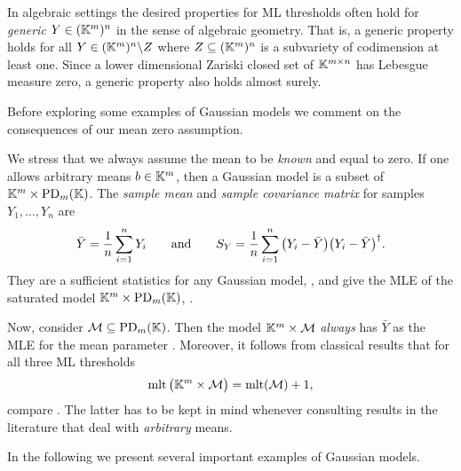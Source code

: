 \begin{remark}\label{rem:GenericVsAlmostSurely}
	In algebraic settings the desired properties for ML thresholds often hold for \emph{generic} $Y \in (\mathbb K^m)^n$ in the sense of algebraic geometry. That is, a generic property holds for all $Y \in (\mathbb K^m)^n \backslash Z$ where $Z \subseteq (\mathbb K^m)^n$ is a subvariety of codimension at least one.
	Since a lower dimensional Zariski closed set of $\mathbb K^{m \times n}$ has Lebesgue measure zero, a generic property also holds almost surely.
	\hfill\remSymbol
\end{remark}

Before exploring some examples of Gaussian models we comment on the consequences of our mean zero assumption.

\begin{remark}\label{rem:MeanZeroVsGeneralMean}
	We stress that we always assume the mean to be \emph{known} and equal to zero.
	If one allows arbitrary means $b \in \mathbb K^m$, then a Gaussian model is a subset of $\mathbb K^m \times \operatorname{PD}_m(\mathbb K)$. The \emph{sample mean} and \emph{sample covariance matrix} for samples $Y_1,\ldots,Y_n$ are
		\[ \bar{Y} = \frac{1}{n} \sum_{i=1}^n Y_i \qquad \text{and} \qquad
		 S_Y = \frac{1}{n} \sum_{i=1}^n \big( Y_i - \bar{Y} \big) \big( Y_i - \bar{Y} \big)^{\dagger} . \]
	They are a sufficient statistics for any Gaussian model, \cite[Theorem~3.4.1]{AndersonBook}, and give the MLE of the saturated model $\mathbb K^m \times \operatorname{PD}_m(\mathbb K)$, \cite[Proposition~5.3.7]{SullivantBook}.
	
	Now, consider $\mathcal{M} \subseteq \operatorname{PD}_m(\mathbb K)$.	
	Then the model $\mathbb K^m \times \mathcal{M}$ \emph{always} has $\bar{Y}$ as the MLE for the mean parameter \cite[Proposition~7.1.9]{SullivantBook}. Moreover, it follows from classical results \cite[Section~3.3]{AndersonBook} that for all three ML thresholds
		\[ \operatorname{mlt} \big( \mathbb K^m \times \mathcal{M} \big) = \operatorname{mlt}(\mathcal{M}) + 1 , \]
	compare \cite[Remark~1.1]{DrtonKurikiHoff}.	%
	The latter has to be kept in mind whenever consulting results in the literature that deal with \emph{arbitrary} means.
	\hfill\remSymbol
\end{remark}


In the following we present several important examples of Gaussian models.

